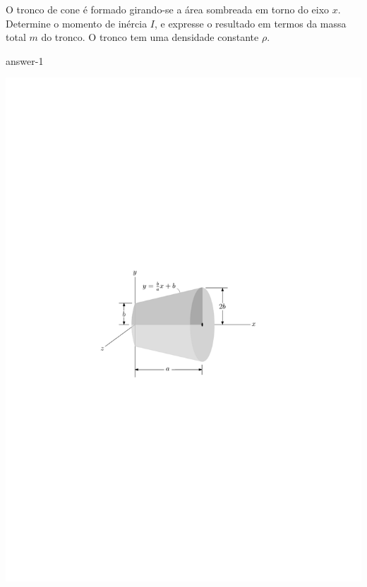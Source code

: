 \item O tronco de cone é formado girando-se a área sombreada em torno do eixo $x$. Determine o momento de inércia $I$, e expresse o resultado em termos da massa total $m$ do tronco. O tronco tem uma densidade constante $\rho$.

{answer-1}

\vspace{-1.5cm}
\begin{flushright}
	\includegraphics[scale=1.05]{../../images/draw_1}
\end{flushright}